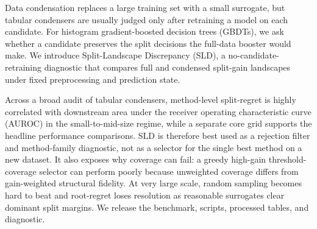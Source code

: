 
Data condensation replaces a large training set with a small surrogate, but
tabular condensers are usually judged only after retraining a model on each
candidate. For histogram gradient-boosted decision trees (GBDTs), we ask whether
a candidate preserves the split decisions the full-data booster would make. We
introduce Split-Landscape Discrepancy (SLD), a no-candidate-retraining
diagnostic that compares full and condensed split-gain landscapes under fixed
preprocessing and prediction state.

Across a broad audit of tabular condensers, method-level split-regret is highly
correlated with downstream area under the receiver operating characteristic
curve (AUROC) in the small-to-mid-size regime, while a separate core grid
supports the headline performance comparisons. SLD is therefore best used as a
rejection filter and method-family diagnostic, not as a selector for the single
best method on a new dataset. It also exposes why coverage can fail: a greedy
high-gain threshold-coverage selector can perform poorly because unweighted
coverage differs from gain-weighted structural fidelity. At very large scale,
random sampling becomes hard to beat and root-regret loses resolution as
reasonable surrogates clear dominant split margins. We release the benchmark,
scripts, processed tables, and diagnostic.
